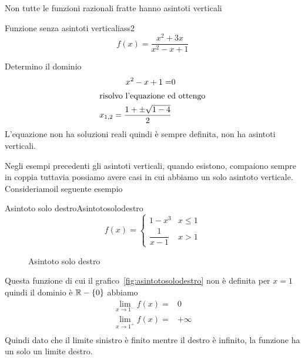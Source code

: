 Non tutte le funzioni razionali fratte hanno asintoti verticali
\begin{cesempiot}{Funzione senza asintoti verticali}{ass2}
	\[f(x)=\dfrac{x^2+3x}{x^2-x+1} \]
\end{cesempiot}
Determino il dominio
\begin{align*}
x^2-x+1=&0\\
\intertext{risolvo l'equazione ed ottengo}
x_{1,2}=\dfrac{1+\pm\sqrt{1-4}}{2}
\end{align*}
L'equazione non ha soluzioni  reali quindi è sempre definita, non ha asintoti verticali.

Negli esempi precedenti gli asintoti verticali, quando esistono, compaiono sempre in coppia tuttavia possiamo avere casi in cui abbiamo un solo asintoto verticale. Consideriamoil seguente esempio
\begin{cesempiot}{Asintoto solo destro}{Asintotosolodestro}
\[ f(x)=\begin{cases}
1-x^3&x\leq 1\\
\dfrac{1}{x-1}&x>1
\end{cases}\]
\end{cesempiot}
\begin{figure}
	\centering
	
	\captionsetup{format=grafico}
	\caption[Asintoto solo destro]{Asintoto solo destro}
	\label{fig:asintotosolodestro}
\end{figure}

Questa funzione di cui il grafico~\vref{fig:asintotosolodestro} non è definita per $x=1$ quindi il dominio è $\mathbb{R}-\lbrace0\rbrace$ abbiamo
\begin{align*}
\lim_{x\to 1^-}f(x)=&0\\
\lim_{x\to 1^+}f(x)=&+\infty\\
\end{align*}
Quindi dato che il limite sinistro è finito mentre il destro è infinito, la funzione ha un solo un limite destro. 
